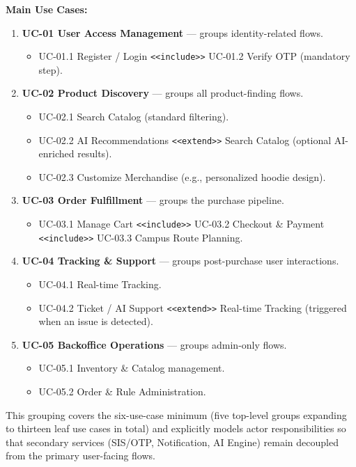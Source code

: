 \documentclass[11pt,a4paper]{article}
\begin{document}
\noindent\textbf{Main Use Cases:}
\begin{enumerate}
    \item \textbf{UC-01 User Access Management} --- groups identity-related flows.
    \begin{itemize}
        \item UC-01.1 Register / Login \texttt{<<include>>} UC-01.2 Verify OTP (mandatory step).
    \end{itemize}
    \item \textbf{UC-02 Product Discovery} --- groups all product-finding flows.
    \begin{itemize}
        \item UC-02.1 Search Catalog (standard filtering).
        \item UC-02.2 AI Recommendations \texttt{<<extend>>} Search Catalog (optional AI-enriched results).
        \item UC-02.3 Customize Merchandise (e.g., personalized hoodie design).
    \end{itemize}
    \item \textbf{UC-03 Order Fulfillment} --- groups the purchase pipeline.
    \begin{itemize}
        \item UC-03.1 Manage Cart \texttt{<<include>>} UC-03.2 Checkout \& Payment \texttt{<<include>>} UC-03.3 Campus Route Planning.
    \end{itemize}
    \item \textbf{UC-04 Tracking \& Support} --- groups post-purchase user interactions.
    \begin{itemize}
        \item UC-04.1 Real-time Tracking.
        \item UC-04.2 Ticket / AI Support \texttt{<<extend>>} Real-time Tracking (triggered when an issue is detected).
    \end{itemize}
    \item \textbf{UC-05 Backoffice Operations} --- groups admin-only flows.
    \begin{itemize}
        \item UC-05.1 Inventory \& Catalog management.
        \item UC-05.2 Order \& Rule Administration.
    \end{itemize}
\end{enumerate}
 
This grouping covers the six-use-case minimum (five top-level groups expanding to thirteen leaf use cases in total) and explicitly models actor responsibilities so that secondary services (SIS/OTP, Notification, AI Engine) remain decoupled from the primary user-facing flows.
 
\end{document}
